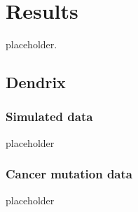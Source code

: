 \chapter{Results} \label{chap:results}

placeholder. 

\section{Dendrix} 

\subsection{Simulated data}

placeholder 

\subsection{Cancer mutation data}

placeholder 

\cleardoublepage
